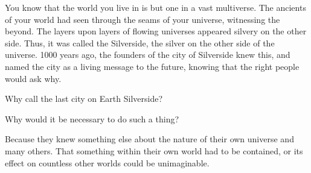 \documentclass[blue]{Silversiders}
\begin{document}
\name{\bSilverside{}}

You know that the world you live in is but one in a vast multiverse. The ancients of your world had seen through the seams of your universe, witnessing the beyond. The layers upon layers of flowing universes appeared silvery on the other side. Thus, it was called the Silverside, the silver on the other side of the universe. 1000 years ago, the founders of the city of Silverside knew this, and named the city as a living message to the future, knowing that the right people would ask why. 

Why call the last city on Earth Silverside?

Why would it be necessary to do such a thing?

Because they knew something else about the nature of their own universe and many others. That something within their own world had to be contained, or its effect on countless other worlds could be unimaginable.
\end{document}
